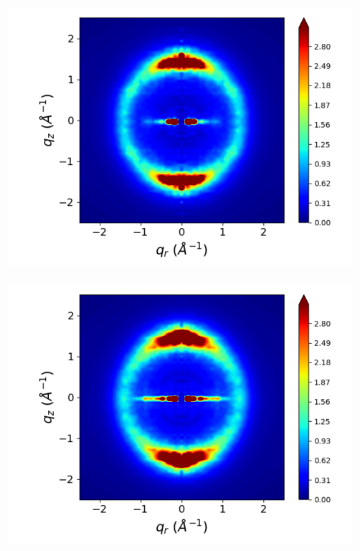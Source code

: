 \documentclass[journal=jpcbfk,manuscript=article]{achemso}
\begin{document}
\begin{figure}[!htb]
  \begin{subfigure}{0.3\linewidth}
  	\centering
  	\includegraphics[width=\textwidth]{rotated_monomers_rzplot_norestraints.pdf}
  	\caption{}\label{fig:rotated_monomers_rzplot_norestraints}
  \end{subfigure}
  \begin{subfigure}{0.3\linewidth}
  	\centering
  	\includegraphics[width=\textwidth]{staggered_rzplot_norestraints.pdf}
  	\caption{}\label{fig:staggered_rzplot_norestraints} 
  \end{subfigure}
  \begin{subfigure}{0.3\linewidth}

\end{subfigure}
\end{figure}
\end{document}

